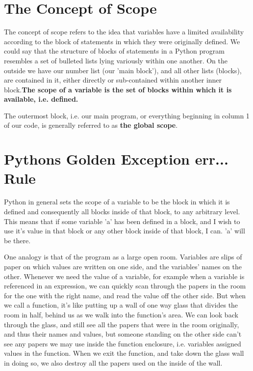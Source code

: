 \section{The Concept of Scope}

The concept of scope refers to the idea that variables have a   limited availability according to the block of statements in which they   were originally defined. We could say that the structure of blocks of   statements in a Python program resembles a set of bulleted lists lying   variously within one another. On the outside we have our number list   (our 'main block'), and all other lists (blocks), are contained   in it, either directly or sub-contained within another inner   block.\textbf{The scope of a variable is the set of blocks within which    it is available, i.e. defined.}

The outermost block, i.e. our main program, or everything beginning   in column 1 of our code, is generally referred to as \textbf{the global   scope}.

\section{Pythons Golden Exception err... Rule}

Python in general sets the scope of a variable to be the block in   which it is defined and consequently all blocks inside of that block,   to any arbitrary level.  This means that if some variable 'a' has been   defined in a block, and I wish to use it's value in that block or any   other block inside of that block, I can. 'a' will be there.

One analogy is that of the program as a large open room. Variables   are slips of paper on which values are written on one side, and the   variables' names on the other. Whenever we need the value of a   variable, for example when a variable is referenced in an expression,   we can quickly scan through the papers in the room for the one with the   right name, and read the value off the other side. But when we call a   function, it's like putting up a wall of one way glass that divides the   room in half, behind us as we walk into the function's area. We can   look back through the glass, and still see all the papers that were in   the room originally, and thus their names and values, but someone   standing on the other side can't see any papers we may use inside the   function enclosure, i.e. variables assigned values in the function.   When we exit the function, and take down the glass wall in doing so, we   also destroy all the papers used on the inside of the wall.


